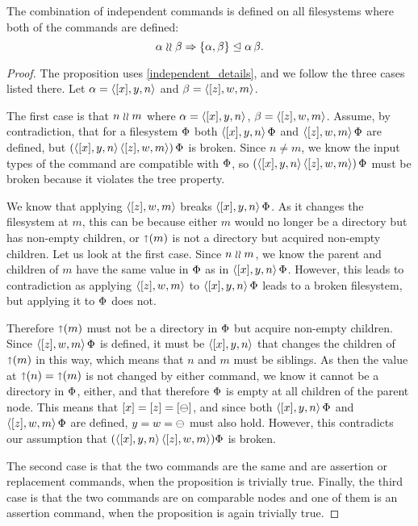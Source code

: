 \begin{mylem}
The combination of independent commands is defined on all filesystems
where both of the commands are defined:
\[ \alpha\mathrel{\wr\wr} \beta \Rightarrow {\{{\alpha, \beta}\}}\trianglelefteq{\alpha\,\beta}. \]
\end{mylem}
\begin{proof}
The proposition uses \cref{independent_details},
and we follow the three cases listed there.
Let $\alpha=\langle{[x],y,n}\rangle$ and $\beta=\langle{[z],w,m}\rangle$.

The first case is that $n\mathrel{\wr\wr} m$ where $\alpha=\langle{[x],y,n}\rangle$, $\beta=\langle{[z],w,m}\rangle$.
Assume, by contradiction, that for a filesystem $\Phi$
both $\langle{[x],y,n}\rangle\,\Phi$ and $\langle{[z],w,m}\rangle\,\Phi$ are defined, but $(\langle{[x],y,n}\rangle\,\langle{[z],w,m}\rangle)\,\Phi$ is broken.
Since $n\neq m$, we know the input types of the command are compatible with $\Phi$,
so $(\langle{[x],y,n}\rangle\,\langle{[z],w,m}\rangle)\,\Phi$ must be broken because it violates the tree property.

We know that applying $\langle{[z],w,m}\rangle$ breaks $\langle{[x],y,n}\rangle\,\Phi$. As it changes the filesystem
at $m$, this can be because either $m$ would no longer be a directory but has non-empty children,
or $\mathord{\shortuparrow}({m})$ is not a directory but acquired non-empty children.
Let us look at the first case.
Since $n\mathrel{\wr\wr} m$, we know the parent and children of $m$ have the same value
in $\Phi$ as in $\langle{[x],y,n}\rangle\,\Phi$. However, this leads to contradiction
as applying $\langle{[z],w,m}\rangle$ to $\langle{[x],y,n}\rangle\,\Phi$ leads to a broken filesystem, but
applying it to $\Phi$ does not.

Therefore $\mathord{\shortuparrow}({m})$ must not be a directory in $\Phi$ but acquire non-empty children.
Since $\langle{[z],w,m}\rangle\,\Phi$ is defined, it must be $\langle{[x],y,n}\rangle$ that changes the children of
$\mathord{\shortuparrow}({m})$ in this way, which means that $n$ and $m$ must be siblings.
As then the value at $\mathord{\shortuparrow}({n})=\mathord{\shortuparrow}({m})$ is not changed by either command,
we know it cannot be a directory in $\Phi$, either, and that therefore
$\Phi$ is empty at all children of the parent node.
This means that $[x]=[z]=[\ominus]$, and
since both $\langle{[x],y,n}\rangle\,\Phi$ and $\langle{[z],w,m}\rangle\,\Phi$ are defined, $y=w=\ominus$ must also hold.
However, this contradicts our assumption that $(\langle{[x],y,n}\rangle\,\langle{[z],w,m}\rangle)\Phi$ is broken.

The second case is that the two commands are the same and are assertion or replacement
commands, when the proposition is trivially true.
Finally, the third case is that the two commands are on comparable nodes and one of them
is an assertion command, when the proposition is again trivially true.
\end{proof}

